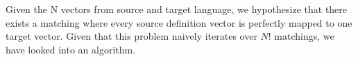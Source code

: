 Given the N vectors from source and target language, we hypothesize that there exists a matching where every source definition vector is perfectly mapped to one target vector.
Given that this problem naively iterates over $N!$ matchings, we have looked into an algorithm.


